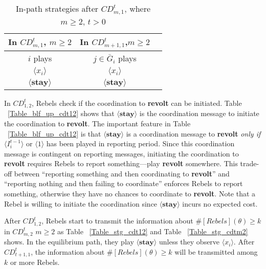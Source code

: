 \documentclass[12pt,letterpaper]{article}
\newtheorem*{main result}{Main Result}
\theoremstyle{definition}
\theoremstyle{remark}
\theoremstyle{claim}
\begin{document}
\begin{table}[ht]
\caption{In-path strategies after $CD^t_{m,1}$, where $m\geq 2$, $t>0$}
\label{Table_stg_cdtm1}
\begin{center}
\begin{tabular}{c c c}
In $CD^t_{m,1}$, $m\geq 2$ 	 	&  	In $CD^t_{m+1,1}$,$m\geq 2$		& 	\\
\hline
\hline
$i$ plays 		  							&  $j\in \bar{G}_{i}$ plays  								& \\
\hline
$\langle x_i \rangle$ 	& 	$\langle x_i \rangle$	    &  \\
$\langle \textbf{stay} \rangle$		&  $\langle \textbf{stay} \rangle$	&  \\

\end{tabular}
\end{center}
\end{table}



In $CD^t_{1,2}$, Rebels check if the coordination to \textbf{revolt} can be initiated. Table ~\ref{Table_blf_up_cdt12} shows that $\langle \textbf{stay} \rangle$ is the coordination message to initiate the coordination to \textbf{revolt}. The important feature in Table ~\ref{Table_blf_up_cdt12} is that $\langle \textbf{stay} \rangle$ is a coordination message to \textbf{revolt} \textit{only if} $\langle  {I^{t-1}_i} \rangle$ or $\langle 1 \rangle$ has been played in reporting period.  Since this coordination message is contingent on reporting messages, initiating the coordination to \textbf{revolt} requires Rebels to report something---play \textbf{revolt} somewhere. This trade-off between ``reporting something and then coordinating to \textbf{revolt}'' and ``reporting nothing and then failing to coordinate'' enforces Rebels to report something, otherwise they have no chances to coordinate to \textbf{revolt}. Note that a Rebel is willing to initiate the coordination since $\langle \textbf{stay} \rangle$ incurs no expected cost. 

After $CD^t_{1,2}$, Rebels start to transmit the information about $\#[Rebels](\theta)\geq k$ in $CD^t_{m,2}$ $m\geq 2$ as Table ~\ref{Table_stg_cdt12} and Table ~\ref{Table_stg_cdtm2} shows. In the equilibrium path, they play $\langle \textbf{stay} \rangle$ unless they observe $\langle x_i \rangle$. After $CD^t_{{t+1},1}$, the information about $\#[Rebels](\theta)\geq k$ will be transmitted among $k$ or more Rebels. 
\end{document}
